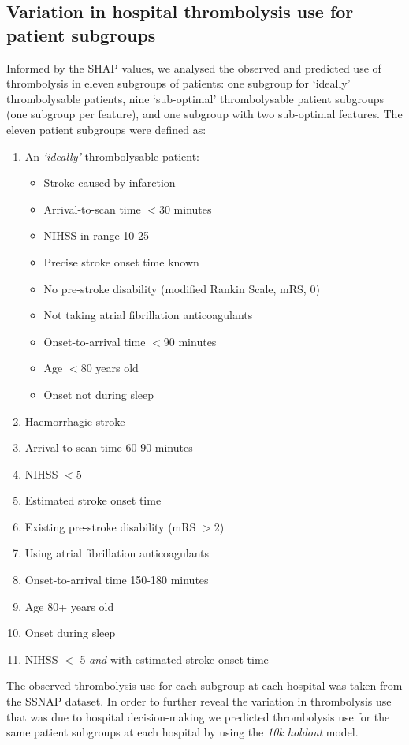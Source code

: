 
\subsection{Variation in hospital thrombolysis use for patient subgroups}

Informed by the SHAP values, we analysed the observed and predicted use of thrombolysis in eleven subgroups of patients: one subgroup for `ideally' thrombolysable patients, nine `sub-optimal' thrombolysable patient subgroups (one subgroup per feature), and one subgroup with two sub-optimal features. The eleven patient subgroups were defined as:

\begin{enumerate}
  \item An \emph{`ideally'} thrombolysable patient:
  \begin{itemize}
    \setlength\itemsep{-2mm}
    \item Stroke caused by infarction
    \item Arrival-to-scan time $<$30 minutes
    \item NIHSS in range 10-25
    \item Precise stroke onset time known
    \item No pre-stroke disability (modified Rankin Scale, mRS, 0)
    \item Not taking atrial fibrillation anticoagulants
    \item Onset-to-arrival time $<$90 minutes
    \item Age $<$80 years old
    \item Onset not during sleep
  \end{itemize}
  \item Haemorrhagic stroke
  \item Arrival-to-scan time 60-90 minutes
  \item NIHSS $<$5
  \item Estimated stroke onset time
  \item Existing pre-stroke disability (mRS $>$2)
  \item Using atrial fibrillation anticoagulants
  \item Onset-to-arrival time 150-180 minutes
  \item Age 80+ years old
  \item Onset during sleep
  \item NIHSS $<$ 5 \emph{and} with estimated stroke onset time
\end{enumerate}

The observed thrombolysis use for each subgroup at each hospital was taken from the SSNAP dataset. In order to further reveal the variation in thrombolysis use that was due to hospital decision-making we predicted thrombolysis use for the same patient subgroups at each hospital by using the \emph{10k holdout} model.

